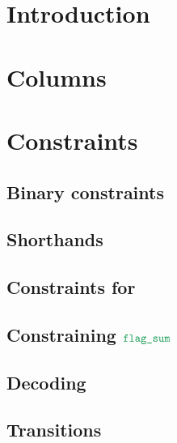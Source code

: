 \section{Introduction}                                                      \label{bls: intro}                                              
\section{Columns}                                                           \label{bls: columns}                                            

\section{Constraints}    
\subsection{Binary constraints}                                             \label{bls: binary}                                             
\subsection{Shorthands}                                                     \label{bls: shorthands}                                         
\subsection{Constraints for \blsStamp{}}                                    \label{bls: stamp}                                              
\subsection{Constraining $\locFlagSum$}                                     \label{bls: flag sum}                                           
\subsection{Decoding}                                                       \label{bls: decoding}                                           
\subsection{Transitions}                                                    \label{bls: transitions}                                        
